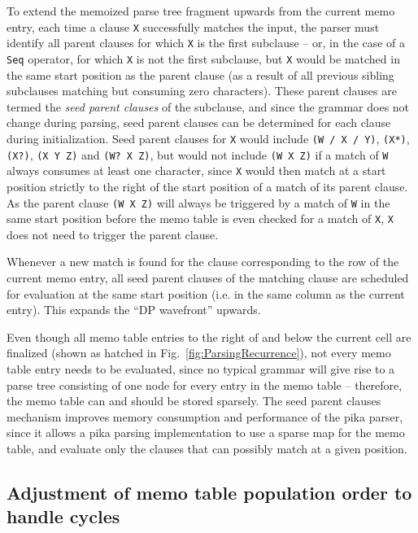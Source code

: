 \documentclass[manuscript,screen]{acmart}
\begin{document}
To extend the memoized parse tree fragment upwards from the current memo entry, each time a clause \texttt{X} successfully matches the input, the parser must identify all parent clauses for which \texttt{X} is the first subclause -- or, in the case of a \texttt{Seq} operator, for which \texttt{X} is not the first subclause, but \texttt{X} would be matched in the same start position as the parent clause (as a result of all previous sibling subclauses matching but consuming zero characters). These parent clauses are termed the \emph{seed parent clauses} of the subclause, and since the grammar does not change during parsing, seed parent clauses can be determined for each clause during initialization. Seed parent clauses for \texttt{X} would include \texttt{(W / X / Y)}, \texttt{(X*)}, \texttt{(X?)}, \texttt{(X Y Z)} and \texttt{(W? X Z)}, but would not include \texttt{(W X Z)} if a match of \texttt{W} always consumes at least one character, since \texttt{X} would then match at a start position strictly to the right of the start position of a match of its parent clause. As the parent clause \texttt{(W X Z)} will always be triggered by a match of \texttt{W} in the same start position before the memo table is even checked for a match of \texttt{X}, \texttt{X} does not need to trigger the parent clause.

Whenever a new match is found for the clause corresponding to the row of the current memo entry, all seed parent clauses of the matching clause are scheduled for evaluation at the same start position (i.e. in the same column as the current entry). This expands the ``DP wavefront'' upwards.

Even though all memo table entries to the right of and below the current cell are finalized (shown as hatched in Fig.~\ref{fig:ParsingRecurrence}), not every memo table entry needs to be evaluated, since no typical grammar will give rise to a parse tree consisting of one node for every entry in the memo table -- therefore, the memo table can and should be stored sparsely. The seed parent clauses mechanism improves memory consumption and performance of the pika parser, since it allows a pika parsing implementation to use a sparse map for the memo table, and evaluate only the clauses that can possibly match at a given position.

\subsection{\label{sec:handlingCycles}Adjustment of memo table population order to handle cycles}
\end{document}
